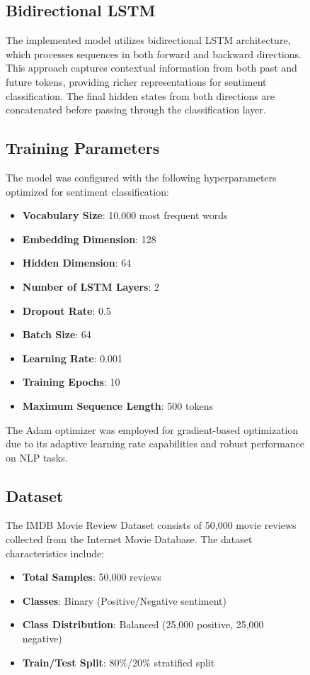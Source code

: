 \documentclass[a4paper, journal]{IEEEtran}
\begin{document}
\begin{figure}[!t]
\subsection{Bidirectional LSTM}

The implemented model utilizes bidirectional LSTM architecture, which processes sequences in both forward and backward directions. This approach captures contextual information from both past and future tokens, providing richer representations for sentiment classification. The final hidden states from both directions are concatenated before passing through the classification layer.


\subsection{Training Parameters}

The model was configured with the following hyperparameters optimized for sentiment classification:

\begin{itemize}
    \item \textbf{Vocabulary Size}: 10,000 most frequent words
    \item \textbf{Embedding Dimension}: 128
    \item \textbf{Hidden Dimension}: 64
    \item \textbf{Number of LSTM Layers}: 2
    \item \textbf{Dropout Rate}: 0.5
    \item \textbf{Batch Size}: 64
    \item \textbf{Learning Rate}: 0.001
    \item \textbf{Training Epochs}: 10
    \item \textbf{Maximum Sequence Length}: 500 tokens
\end{itemize}

The Adam optimizer was employed for gradient-based optimization due to its adaptive learning rate capabilities and robust performance on NLP tasks.

\subsection{Dataset}

The IMDB Movie Review Dataset consists of 50,000 movie reviews collected from the Internet Movie Database. The dataset characteristics include:

\begin{itemize}
    \item \textbf{Total Samples}: 50,000 reviews
    \item \textbf{Classes}: Binary (Positive/Negative sentiment)
    \item \textbf{Class Distribution}: Balanced (25,000 positive, 25,000 negative)
    \item \textbf{Train/Test Split}: 80\%/20\% stratified split
\end{itemize}


\end{figure}
\end{document}
